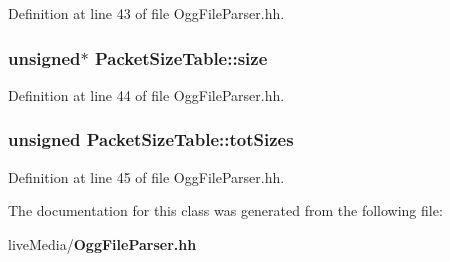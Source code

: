 Definition at line 43 of file Ogg\+File\+Parser.\+hh.

\subsubsection[{size}]{\setlength{\rightskip}{0pt plus 5cm}unsigned$\ast$ Packet\+Size\+Table\+::size}\label{classPacketSizeTable_a4e978a9b8d42bbd777392ed20adcc293}


Definition at line 44 of file Ogg\+File\+Parser.\+hh.

\subsubsection[{tot\+Sizes}]{\setlength{\rightskip}{0pt plus 5cm}unsigned Packet\+Size\+Table\+::tot\+Sizes}\label{classPacketSizeTable_ae69939fdfc1fdae1ecc4bb3388166e01}


Definition at line 45 of file Ogg\+File\+Parser.\+hh.



The documentation for this class was generated from the following file\+:\begin{DoxyCompactItemize}
\item 
live\+Media/{\bf Ogg\+File\+Parser.\+hh}\end{DoxyCompactItemize}
